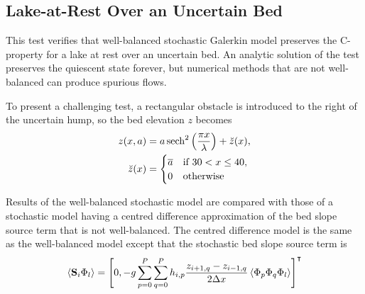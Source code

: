 \subsection{Lake-at-Rest Over an Uncertain Bed}

This test verifies that well-balanced stochastic Galerkin model preserves the C-property for a lake at rest over an uncertain bed.
An analytic solution of the test preserves the quiescent state forever, but numerical methods that are not well-balanced can produce spurious flows.

To present a challenging test, a rectangular obstacle is introduced to the right of the uncertain hump, so the bed elevation $z$ becomes
\begin{subequations}
\begin{align}
    z(x, a) &= a \operatorname{sech}^2 \left( \frac{\pi x}{\lambda} \right) + \breve{z}(x) \text{,} \\
    \breve{z}(x) &= \begin{cases}
    \overline{a} & \text{if $30 < x \leq 40$,} \\
    0 & \text{otherwise}
    \end{cases}
\end{align}
\end{subequations}

Results of the well-balanced stochastic model are compared with those of a stochastic model having a centred difference approximation of the bed slope source term that is not well-balanced.
The centred difference model is the same as the well-balanced  model except that the stochastic bed slope source term is
\begin{align}
    \left\langle \mathbf{S}_i \Phi_l \right\rangle =
    \left[ 0, -g \sum_{p=0}^P \sum_{q=0}^P h_{i,p}
    \frac{z_{i+1,q} - z_{i-1,q}}{2 \Delta x}
    \left\langle \Phi_p \Phi_q \Phi_l \right\rangle \right]^\intercal
\end{align}

